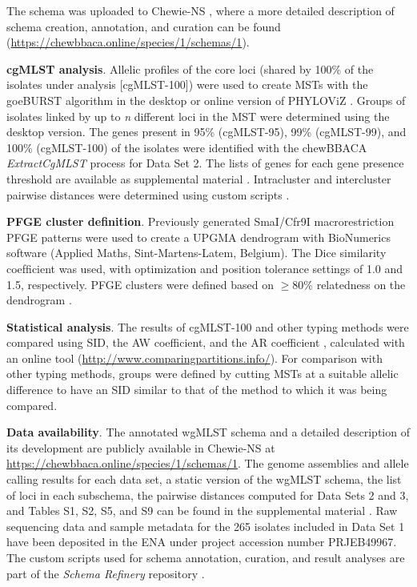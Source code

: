 The schema was uploaded to \ac{Chewie-NS} \cite{mamede_chewie_2021}, where a more detailed description of schema creation, annotation, and curation can be found (\url{https://chewbbaca.online/species/1/schemas/1}).

\textbf{cgMLST analysis}. Allelic profiles of the core loci (shared by 100\% of the isolates under analysis [cgMLST-100]) were used to create \ac{MST}s with the goeBURST algorithm in the desktop or online version of PHYLOViZ \cite{nascimento_phyloviz_2017, ribeiro-goncalves_phyloviz_2016}. Groups of isolates linked by up to \textit{n} different loci in the \ac{MST} were determined using the desktop version. The genes present in 95\% (cgMLST-95), 99\% (cgMLST-99), and 100\% (cgMLST-100) of the isolates were identified with the chewBBACA \textit{ExtractCgMLST} process for Data Set 2. The lists of genes for each gene presence threshold are available as supplemental material \cite{friaes_supplemental_2023}. Intracluster and intercluster pairwise distances were determined using custom scripts \cite{noauthor_release_nodate-4}.

\textbf{PFGE cluster definition}. Previously generated SmaI/Cfr9I macrorestriction \ac{PFGE} patterns \cite{friaes_superantigen_2013, friaes_group_2012, blackwell_exploring_2021, noauthor_emstreptococcus_nodate} were used to create a \ac{UPGMA} dendrogram with BioNumerics software (Applied Maths, Sint-Martens-Latem, Belgium). The Dice similarity coefﬁcient was used, with optimization and position tolerance settings of 1.0 and 1.5, respectively. \ac{PFGE} clusters were defined based on $\geq80\%$ relatedness on the dendrogram \cite{carrico_illustration_2006}.

\textbf{Statistical analysis}. The results of cgMLST-100 and other typing methods were compared using \ac{SID}, the \ac{AW} coefficient, and the \ac{AR} coefficient \cite{carrico_illustration_2006, severiano_adjusted_2011}, calculated with an online tool (\url{http://www.comparingpartitions.info/}). For comparison with other typing methods, groups were defined by cutting \ac{MST}s at a suitable allelic difference to have an \ac{SID} similar to that of the method to which it was being compared.

\textbf{Data availability}. The annotated \ac{wgMLST} schema and a detailed description of its development are publicly available in \ac{Chewie-NS} \cite{mamede_chewie_2021} at \url{https://chewbbaca.online/species/1/schemas/1}. The genome assemblies and allele calling results for each data set, a static version of the \ac{wgMLST} schema, the list of loci in each subschema, the pairwise distances computed for Data Sets 2 and 3, and Tables S1, S2, S5, and S9 can be found in the supplemental material \cite{friaes_supplemental_2023}. Raw sequencing data and sample metadata for the 265 isolates included in Data Set 1 have been deposited in the \ac{ENA} under project accession number PRJEB49967. The custom scripts used for schema annotation, curation, and result analyses are part of the \textit{Schema Refinery} repository \cite{noauthor_release_nodate-4}.


